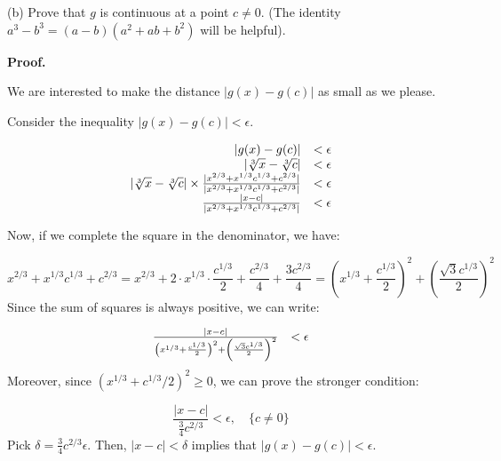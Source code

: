 \documentclass[10pt]{article}
\begin{document}
(b) Prove that $\displaystyle g$ is continuous at a point $\displaystyle c\neq 0$. (The identity $\displaystyle a^{3} -b^{3} =( a-b)\left( a^{2} +ab+b^{2}\right)$ will be helpful).



\textbf{Proof.}



We are interested to make the distance $\displaystyle |g( x) -g( c) |$ as small as we please.



Consider the inequality $\displaystyle |g( x) -g( c) |< \epsilon $.




\begin{equation*}
\begin{array}{ r l }
|g( x) -g( c) | & < \epsilon \\
|\sqrt[3] x-\sqrt[3] c| & < \epsilon \\
|\sqrt[3] x-\sqrt[3] c|\times \frac{|x^{2/3} +x^{1/3} c^{1/3} +c^{2/3} |}{|x^{2/3} +x^{1/3} c^{1/3} +c^{2/3} |} & < \epsilon \\
\frac{|x-c|}{|x^{2/3} +x^{1/3} c^{1/3} +c^{2/3} |} & < \epsilon 
\end{array}
\end{equation*}


Now, if we complete the square in the denominator, we have:


\begin{equation*}
x^{2/3} +x^{1/3} c^{1/3} +c^{2/3} =x^{2/3} +2\cdot x^{1/3} \cdot \frac{c^{1/3}}{2} +\frac{c^{2/3}}{4} +\frac{3c^{2/3}}{4} =\left( x^{1/3} +\frac{c^{1/3}}{2}\right)^{2} +\left(\frac{\sqrt{3} c^{1/3}}{2}\right)^{2}
\end{equation*}
Since the sum of squares is always positive, we can write:


\begin{equation*}
\begin{array}{ r l }
\frac{|x-c|}{\left( x^{1/3} +\frac{c^{1/3}}{2}\right)^{2} +\left(\frac{\sqrt{3} c^{1/3}}{2}\right)^{2}} & < \epsilon 
\end{array}
\end{equation*}
Moreover, since $\displaystyle \left( x^{1/3} +c^{1/3} /2\right)^{2} \geq 0$, we can prove the stronger condition:


\begin{equation*}
\frac{|x-c|}{\frac{3}{4} c^{2/3}} < \epsilon ,\quad \{c\neq 0\}
\end{equation*}
Pick $\displaystyle \delta =\frac{3}{4} c^{2/3} \epsilon $. Then, $\displaystyle |x-c|< \delta $ implies that $\displaystyle |g( x) -g( c) |< \epsilon $.
\end{document}
